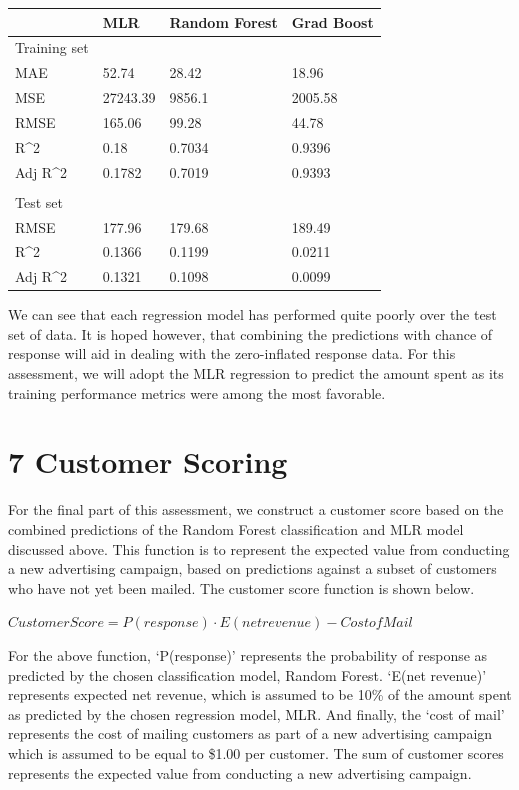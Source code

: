 \documentclass[]{article}
\begin{document}
\begin{longtable}[]{@{}llll@{}}
\toprule
& MLR & Random Forest & Grad Boost\tabularnewline
\midrule
\endhead
Training set & & &\tabularnewline
MAE & 52.74 & 28.42 & 18.96\tabularnewline
MSE & 27243.39 & 9856.1 & 2005.58\tabularnewline
RMSE & 165.06 & 99.28 & 44.78\tabularnewline
R\^{}2 & 0.18 & 0.7034 & 0.9396\tabularnewline
Adj R\^{}2 & 0.1782 & 0.7019 & 0.9393\tabularnewline
& & &\tabularnewline
Test set & & &\tabularnewline
RMSE & 177.96 & 179.68 & 189.49\tabularnewline
R\^{}2 & 0.1366 & 0.1199 & 0.0211\tabularnewline
Adj R\^{}2 & 0.1321 & 0.1098 & 0.0099\tabularnewline
\bottomrule
\end{longtable}

We can see that each regression model has performed quite poorly over
the test set of data. It is hoped however, that combining the
predictions with chance of response will aid in dealing with the
zero-inflated response data. For this assessment, we will adopt the MLR
regression to predict the amount spent as its training performance
metrics were among the most favorable.

\section{7 Customer Scoring}\label{customer-scoring}

For the final part of this assessment, we construct a customer score
based on the combined predictions of the Random Forest classification
and MLR model discussed above. This function is to represent the
expected value from conducting a new advertising campaign, based on
predictions against a subset of customers who have not yet been mailed.
The customer score function is shown below.

\(CustomerScore = P(response) \cdot E(netrevenue) - CostofMail\)

For the above function, `P(response)' represents the probability of
response as predicted by the chosen classification model, Random Forest.
`E(net revenue)' represents expected net revenue, which is assumed to be
10\% of the amount spent as predicted by the chosen regression model,
MLR. And finally, the `cost of mail' represents the cost of mailing
customers as part of a new advertising campaign which is assumed to be
equal to \$1.00 per customer. The sum of customer scores represents the
expected value from conducting a new advertising campaign.
\end{document}
